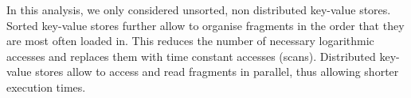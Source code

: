 In this analysis, we only considered unsorted, non distributed key-value stores. Sorted key-value stores further allow to organise fragments in the order that they are most often loaded in. This reduces the number of necessary logarithmic accesses and replaces them with time constant accesses (scans). Distributed key-value stores allow to access and read fragments in parallel, thus allowing shorter execution times. 